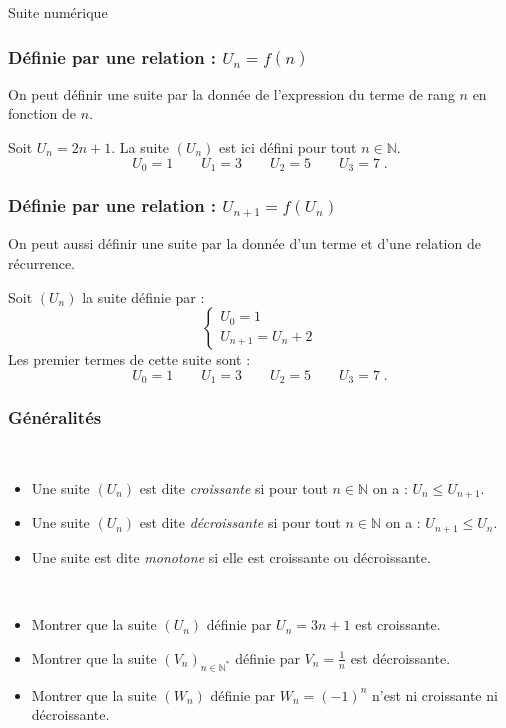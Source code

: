 \begin{chapter}{Suite num\'erique}
\subsubsection{D\'efinie par une relation : $U_{n} = f(n)$}
On peut d\'efinir une suite par la donn\'ee de l'expression du terme de rang $n$ en fonction de $n$.
\begin{ex}
      Soit $U_n = 2n + 1$.
      La suite $(U_n)$ est ici d\'efini pour tout $n \in \mathbb{N}$.
      \[
            U_0 = 1 \qquad U_1 = 3 \qquad U_2 = 5 \qquad U_3 = 7 \; .
      \]
\end{ex}
\subsubsection{D\'efinie par une relation : $U_{n+1} = f(U_n)$}
On peut aussi d\'efinir une suite par la donn\'ee d'un terme et d'une relation de r\'ecurrence.
\begin{ex}
Soit $(U_n)$ la suite d\'efinie par : 
      \[
            \left\lbrace
                  \begin{matrix}
                        U_0 = 1 \\
                        U_{n+1} = U_n + 2
                  \end{matrix}
            \right.
      \]
      Les premier termes de cette suite sont : 
      \[
            U_0 = 1 \qquad U_1 = 3 \qquad U_2 = 5 \qquad U_3 = 7 \; .
      \]
\end{ex}
%
\subsubsection{G\'en\'eralit\'es}
%
\begin{defi} ~ \\
%
\begin{itemize} 
\item Une suite $(U_n)$ est dite \emph{croissante} si pour tout $n \in \mathbb{N}$ on a : $U_{n} \leq U_{n+1}$.
\item Une suite $(U_n)$ est dite \emph{d\'ecroissante} si pour tout $n \in \mathbb{N}$ on a : $U_{n+1} \leq U_{n}$.
\item Une suite est dite \emph{monotone} si elle est croissante ou d\'ecroissante.
\end{itemize}
\end{defi}
%
\begin{exe}\label{exe:suite-1} ~ \\
\label{exe:suite monotones}
\begin{itemize} 
\item Montrer que la suite $(U_n)$ d\'efinie par $U_n = 3 n + 1 $ est croissante.
\item Montrer que la suite $(V_n)_{n \in \mathbb{N}^*}$ d\'efinie par $V_n = \frac{1}{n} $ est d\'ecroissante.
\item Montrer que la suite $(W_n)$ d\'efinie par $W_n = (-1)^n $ n'est ni croissante ni d\'ecroissante.
\end{itemize}


\end{exe}
\end{chapter}
